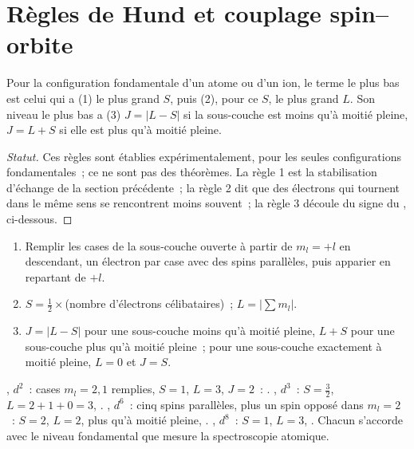 \section{Règles de Hund et couplage spin--orbite}

\begin{proposition}\label{prop:b3:many-electron-atoms:hund-terms}
Pour la configuration fondamentale d'un atome ou d'un ion, le terme le
plus bas est celui qui a (1) le plus grand $S$, puis (2), pour ce $S$, le
plus grand $L$. Son niveau le plus bas a (3) $J = |L - S|$ si la
sous-couche est moins qu'à moitié pleine, $J = L +
S$ si elle est plus qu'à moitié pleine.
\end{proposition}
\begin{proof}[Statut]
Ces règles sont établies expérimentalement, pour les seules
configurations fondamentales~; ce ne sont pas des théorèmes. La règle 1
est la stabilisation d'échange de la section précédente~; la règle 2 dit
que des électrons qui tournent dans le même sens se rencontrent moins
souvent~; la règle 3 découle du signe du ,
ci-dessous.
\end{proof}

\begin{method}\label{met:b3:many-electron-atoms:ground-term}
\begin{enumerate}
  \item Remplir les cases de la sous-couche ouverte à partir de
        $m_l = +l$ en descendant, un électron par case avec des spins
        parallèles, puis apparier en repartant de $+l$.
  \item $S = \frac12 \times$(nombre d'électrons célibataires)~; $L = |\sum m_l|$.
  \item $J = |L - S|$ pour une sous-couche moins qu'à moitié pleine,
        $L + S$ pour une sous-couche plus qu'à moitié
        pleine~; pour une sous-couche exactement à moitié pleine,
        $L = 0$ et $J = S$.
\end{enumerate}
\end{method}

\begin{example}\label{ex:b3:many-electron-atoms:ground-terms}
, $d^2$~: cases $m_l = 2, 1$ remplies, $S = 1$, $L = 3$, $J = 2$~:
. , $d^3$~: $S = \frac32$, $L = 2 + 1 + 0 = 3$,
. , $d^6$~: cinq spins parallèles, plus un spin
opposé dans $m_l = 2$~:
$S = 2$, $L = 2$, plus qu'à moitié pleine, . , $d^8$~:
$S = 1$, $L = 3$, . Chacun s'accorde avec le niveau
fondamental que mesure la spectroscopie atomique.
\end{example}

